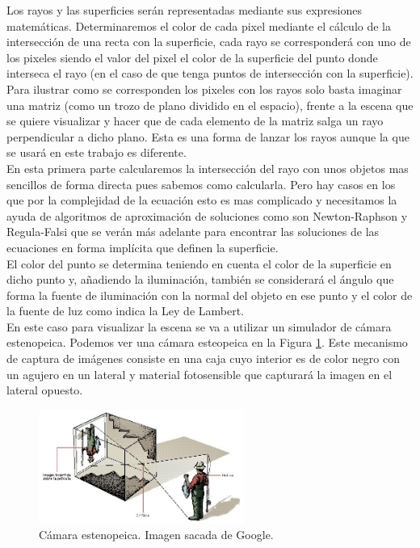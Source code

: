 Los rayos y las superficies serán representadas mediante sus expresiones matemáticas. Determinaremos el color de cada pixel mediante el cálculo de la intersección de una recta con la superficie, cada rayo se corresponderá con uno de los pixeles siendo el valor del pixel el color de la superficie del punto donde interseca el rayo (en el caso de que tenga puntos de intersección con la superficie). Para ilustrar como se corresponden los pixeles con los rayos solo basta imaginar una matriz (como un trozo de plano dividido en el espacio), frente a la escena que se quiere visualizar y hacer que de cada elemento de la matriz salga un rayo perpendicular a dicho plano. Esta es una forma de lanzar los rayos aunque la que se usará en este trabajo es diferente.
	${ }$\\	
	
En esta primera parte calcularemos la intersección del rayo con unos objetos mas sencillos de forma directa pues sabemos como calcularla. Pero hay casos en los que por la complejidad de la ecuación esto es mas complicado y necesitamos la ayuda de algoritmos de aproximación de soluciones como son Newton-Raphson y Regula-Falsi que se verán más adelante para encontrar las soluciones de las ecuaciones en forma implícita que definen la superficie.
${ }$\\
	
El color del punto se determina teniendo en cuenta el color de la superficie en dicho punto y, añadiendo la iluminación, también se considerará el ángulo que forma la fuente de iluminación con la normal del objeto en ese punto y el color de la fuente de luz como indica la Ley de Lambert.
	${ }$\\	

En este caso para visualizar la escena se va a utilizar un simulador de cámara estenopeica. Podemos ver una cámara esteopeica en la Figura \ref{fig:etiq_1}. Este mecanismo de captura de imágenes consiste en una caja cuyo interior es de color negro con un agujero en un lateral y material fotosensible que capturará la imagen en el lateral opuesto.
	${ }$\\	


\begin{figure}[h]
	\begin{center}
		\includegraphics[width=0.6\textwidth]{imagenes/camara-estenopeica.jpg}
	\end{center}
	\caption{Cámara estenopeica. Imagen sacada de Google.}
	\label{fig:etiq_1}
\end{figure}

